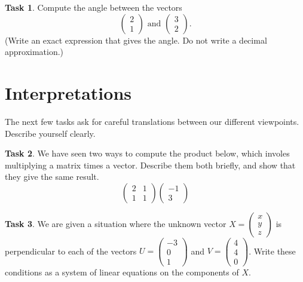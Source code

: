 \documentclass[11pt]{amsart}
\theoremstyle{definition}
\newtheorem{task}{Task}
\begin{document}
\begin{task} Compute the angle between the vectors
\begin{equation*}
\begin{pmatrix} 2 \\ 1 \end{pmatrix} \text{ and } \begin{pmatrix} 3 \\ 2 \end{pmatrix}.
\end{equation*}
(Write an exact expression that gives the angle. Do not write a decimal approximation.)
\end{task}





\section{Interpretations}

The next few tasks ask for careful translations between our different viewpoints. Describe yourself clearly.

\begin{task} We have seen two ways to compute the product below, which involes multiplying a matrix times a vector. Describe them both briefly, and show that they give the same result.
\begin{equation*}
\begin{pmatrix}
2 & 1 \\ 1 & 1
\end{pmatrix}
\begin{pmatrix} -1 \\ 3 \end{pmatrix}
\end{equation*}
\end{task}

\begin{task} We are given a situation where the unknown vector $X = \left(\begin{smallmatrix} x \\ y \\ z \end{smallmatrix} \right)$ is perpendicular to each of the vectors $U = \left( \begin{smallmatrix} -3 \\ 0 \\ 1 \end{smallmatrix} \right)$ and $V = \left(\begin{smallmatrix} 4 \\ 4 \\ 0 \end{smallmatrix}\right)$. Write these conditions as a system of linear equations on the components of $X$.
\end{task}
\end{document}
